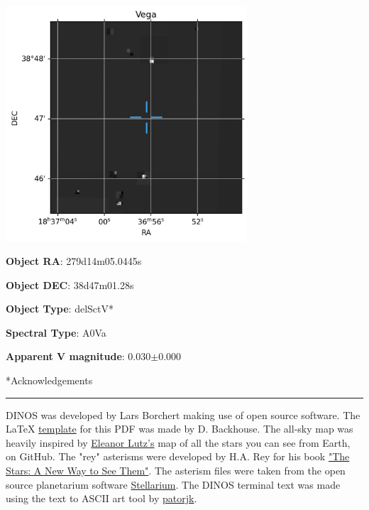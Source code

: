 \documentclass[12pt,preprintnumbers,amsmath,amssymb,nofootinbib,superscriptaddress]{revtex4-1}
\begin{document}
\begin{minipage}{0.6\textwidth}
    \includegraphics[width=9cm]{example_output/finder_Vega.jpg}
\vspace{-2cm}

\end{minipage}
\begin{minipage}{0.3\textwidth}

\textbf{Object RA}: 279d14m05.0445s

\textbf{Object DEC}: 38d47m01.28s

\textbf{Object Type}: delSctV*

\textbf{Spectral Type}: A0Va

\textbf{Apparent V magnitude}: 0.030$\pm$0.000

\end{minipage}


\newpage

*{Acknowledgements}
\vspace{-0.2cm}\hrule
\vspace{1cm}

DINOS was developed by Lars Borchert making use of open source software.
The LaTeX \href{https://www.overleaf.com/latex/templates/academic-presentation-template/jpgfpsstrwzd}{template} for this PDF was made by D. Backhouse.
The all-sky map was heavily inspired by \href{https://github.com/eleanorlutz/western_constellations_atlas_of_space}{Eleanor Lutz's} map of all the stars you can see from Earth, on GitHub.
The "rey" asterisms were developed by H.A. Rey for his book \href{https://en.wikipedia.org/wiki/The_Stars:_A_New_Way_to_See_Them}{"The Stars: A New Way to See Them"}.
The asterism files were taken from the open source planetarium software \href{https://stellarium.org/}{Stellarium}.
The DINOS terminal text was made using the text to ASCII art tool by \href{http://patorjk.com/software/taag/#p=display&f=Bi}{patorjk}.
\end{document}
